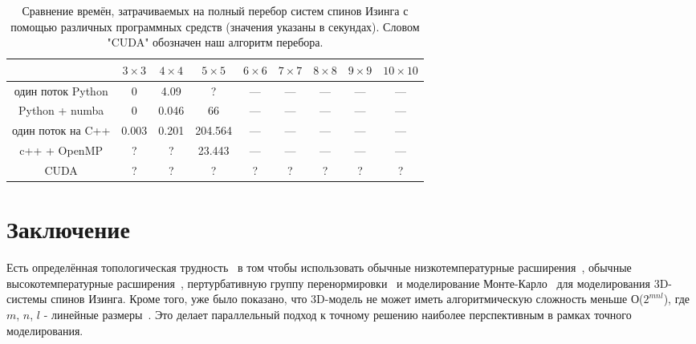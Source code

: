 \documentclass[utf8, babel, sor, jor, amsmath, amssymb, reprint]{elsarticle} %
\begin{document}
	\begin{table}[h]
    \begin{center}
        \label{Time_Table}
        \caption{Сравнение времён, затрачиваемых на полный перебор систем спинов Изинга с помощью различных программных средств (значения указаны в секундах). Словом "CUDA" обозначен наш алгоритм перебора.}
        \begin{tabular}{|c|c|c|c|c|c|c|c|c|}
            \hline
                  & $3 \times 3$ & $4 \times 4$ & $5 \times 5$ & $6 \times 6$ & $7 \times 7$ & $8 \times 8$ & $9 \times 9$ & $10 \times 10$ \\ \hline
один поток Python & 0            & 4.09         & ?            & ---          & ---          & ---          & ---          & ---            \\ \hline
Python + numba    & 0            & 0.046        & 66           & ---          & ---          & ---          & ---          & ---            \\ \hline
один поток на C++ & 0.003        & 0.201        & 204.564      & ---          & ---          & ---          & ---          & ---            \\ \hline
c++ + OpenMP      & ?            & ?            & 23.443       & ---          & ---          & ---          & ---          & ---            \\ \hline
CUDA              & ?            & ?            & ?            & ?            & ?            & ?            & ?            & ?              \\ \hline
        \end{tabular}
    \end{center}
\end{table}

	\section*{Заключение}
	Есть определённая топологическая трудность~\cite{zhang2018topological} в том чтобы использовать обычные низкотемпературные расширения~\cite{katz2007mathematics}, обычные высокотемпературные расширения~\cite{zhang2013mathematical}, пертурбативную группу перенормировки~\cite{zhang2016mathematical} и моделирование Монте-Карло~\cite{zhang2017nature} для моделирования 3D-системы спинов Изинга. Кроме того, уже было показано, что 3D-модель не может иметь алгоритмическую сложность меньше О($2^{mnl}$), где $m$, $n$, $l$ - линейные размеры~\cite{zhang2020computational}. Это делает параллельный подход к точному решению наиболее перспективным в рамках точного моделирования.
\end{document}
